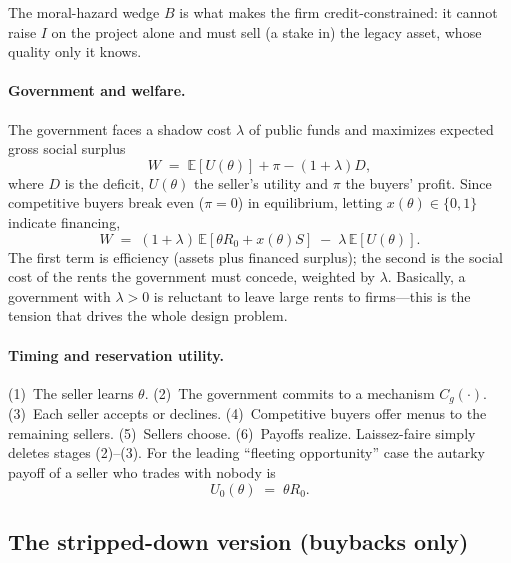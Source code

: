 \documentclass[11pt]{article}
\theoremstyle{definition}
\theoremstyle{plain}
\newcommand{\E}{\mathbb{E}}
\begin{document}
The moral-hazard wedge $B$ is what makes the firm credit-constrained: it
cannot raise $I$ on the project alone and must sell (a stake in) the legacy
asset, whose quality only it knows. 

\paragraph{Government and welfare.} The government faces a shadow cost $\lambda$
of public funds and maximizes expected gross social surplus
\[
W \;=\; \E[U(\theta)] + \pi - (1+\lambda)D ,
\]
where $D$ is the deficit, $U(\theta)$ the seller's utility and $\pi$ the buyers'
profit. Since competitive buyers break even ($\pi=0$) in equilibrium, letting
$x(\theta)\in\{0,1\}$ indicate financing,
\[
W \;=\; (1+\lambda)\,\E[\theta R_0 + x(\theta) S] \;-\; \lambda\,\E[U(\theta)] .
\]
The first term is efficiency (assets plus financed surplus); the second is the
social cost of the rents the government must concede, weighted by
$\lambda$. Basically, a government with $\lambda>0$ is reluctant to leave large rents to
firms---this is the tension that drives the whole design problem.

\paragraph{Timing and reservation utility.} (1)~The seller learns $\theta$.
(2)~The government commits to a mechanism $C_g(\cdot)$. (3)~Each seller accepts
or declines. (4)~Competitive buyers offer menus to the remaining sellers.
(5)~Sellers choose. (6)~Payoffs realize. Laissez-faire simply deletes
stages (2)--(3). For the leading ``fleeting opportunity'' case the autarky
payoff of a seller who trades with nobody is
\[
U_0(\theta) \;=\; \theta R_0 .
\]

\subsection{The stripped-down version (buybacks only)}
\end{document}

